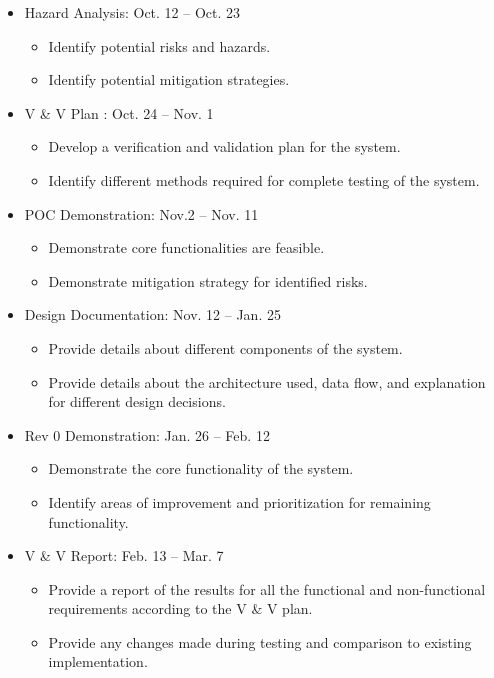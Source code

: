 \documentclass[12pt]{article}
\begin{document}
\begin{itemize}
  \item Hazard Analysis: Oct. 12 -- Oct. 23  
  \begin{itemize}
    \item Identify potential risks and hazards.
    \item Identify potential mitigation strategies.
  \end{itemize}

  \item V \& V Plan : Oct. 24 -- Nov. 1  
  \begin{itemize}
    \item Develop a verification and validation plan for the system.
    \item Identify different methods required for complete testing of the system.
  \end{itemize}

  \item POC Demonstration: Nov.2  -- Nov. 11  
  \begin{itemize}
    \item Demonstrate core functionalities are feasible.
    \item Demonstrate mitigation strategy for identified risks.
  \end{itemize}

  \item Design Documentation: Nov. 12 -- Jan. 25 
  \begin{itemize}
    \item Provide details about different components of the system.
    \item Provide details about the architecture used, data flow, and explanation for different design decisions.
  \end{itemize}

  \item Rev 0 Demonstration: Jan. 26 -- Feb. 12
  \begin{itemize}
    \item Demonstrate the core functionality of the system.
    \item Identify areas of improvement and prioritization for remaining functionality.
  \end{itemize}

  \item V \& V Report: Feb. 13 -- Mar. 7 
  \begin{itemize}
    \item Provide a report of the results for all the functional and non-functional requirements according to the V \& V plan.
    \item Provide any changes made during testing and comparison to existing implementation.
  \end{itemize}
  

\end{itemize}
\end{document}
